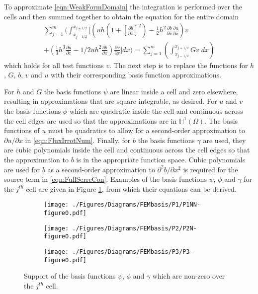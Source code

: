 \documentclass[AMA,STIX1COL]{WileyNJD-v2}
\begin{document}
To approximate \eqref{eqn:WeakFormDomain} the integration is performed over the cells and then summed together to obtain the equation for the entire domain
\begin{multline}
\label{eq:elementwiseint}
\sum_{j=1}^m \Bigg(  \int_{x_{j-1/2} }^{{x_{j+1/2}}} \Bigg[  \left( uh \left(1 + \left[\frac{\partial b}{\partial x}\right]^2 \right)  - \frac{1}{2}h^2\frac{\partial b}{\partial x}  \frac{\partial u }{\partial x} \right) v   \\ +  \left(\frac{1}{3}h^3  \frac{\partial {u}}{\partial x}    -     1/2 uh^2\frac{\partial b}{\partial x}    \right) \frac{\partial v }{\partial x} \Bigg]dx \Bigg)  =  \sum_{j=1}^m \left( \int_{x_{j-1/2} }^{{x_{j+1/2}}} Gv \; dx  \right)
\end{multline}
which holds for all test functions $v$. The next step is to replace the functions for $h$, $G$, $b$, $v$ and $u$ with their corresponding basis function approximations.

For $h$ and $G$ the basis functions $\psi$ are linear inside a cell and zero elsewhere, resulting in approximations that are square integrable, as desired.
For $u$ and $v$ the basis functions $\phi$ which are quadratic inside the cell and continuous across the cell edges are used so that the approximations are in $\mathbb{H}^{1}(\Omega)$. The basis functions of $u$ must be quadratics to allow for a second-order approximation to $\partial u / \partial x$ in \eqref{eqn:FluxIrrotNum}. Finally, for $b$ the basis functions $\gamma$ are used, they are cubic polynomials inside the cell and continuous across the cell edges so that the approximation to $b$ is in the appropriate function space. Cubic polynomials are used for $b$ as a second-order approximation to $\partial^2 b / \partial x^2$ is required for the source term in \eqref{eqn:FullSerreCon}. Examples of the basis functions $\psi$, $\phi$ and $\gamma$ for the $j^{th}$ cell are given in Figure \ref{fig:P1DiscBasis}, from which their equations can be derived.

\begin{figure}
	\centering
		\begin{subfigure}{0.6\textwidth}
			\texttt{[image: ./Figures/Diagrams/FEMbasis/P1/P1NN-figure0.pdf]}
			\subcaption{$\psi$}
			\vspace{0.5cm}
		\end{subfigure}
		\begin{subfigure}{0.6\textwidth}
			\texttt{[image: ./Figures/Diagrams/FEMbasis/P2/P2N-figure0.pdf]}
			\subcaption{$\phi$}
			\vspace{0.5cm}
		\end{subfigure}
		\begin{subfigure}{0.6\textwidth}
			\texttt{[image: ./Figures/Diagrams/FEMbasis/P3/P3-figure0.pdf]}
			\subcaption{$\gamma$}
			\vspace{0.5cm}
		\end{subfigure}
	\caption{Support of the basis functions $\psi$, $\phi$ and $\gamma$ which are non-zero over the $j^{th}$ cell.}
	\label{fig:P1DiscBasis}
\end{figure}
\end{document}
